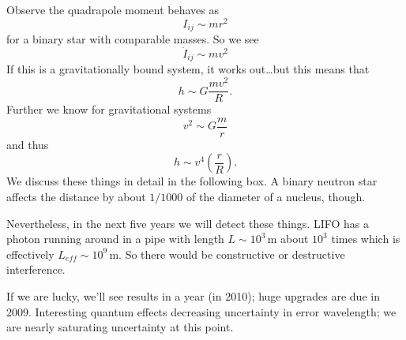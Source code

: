 Observe the quadrapole moment behaves as
\begin{equation}
I_{ij}\sim mr^{2}
\end{equation}
for a binary star with comparable masses. So we see
\begin{equation}
\ddot{I}_{ij}\sim mv^{2}
\end{equation}
If this is a gravitationally bound system, it works out\dots but
this means that
\begin{equation}
h\sim G\frac{mv^{2}}{R}.
\end{equation}
Further we know for gravitational systems
\begin{equation}
v^{2}\sim G\frac{m}{r}
\end{equation}
and thus
\begin{equation}
h\sim v^{4}\left(\frac{r}{R}\right).
\end{equation}
We discuss these things in detail in the following box. A binary
neutron star affects the distance by about $1/1000$ of the
diameter of a nucleus, though.


Nevertheless, in the next five years we will detect these
things. LIFO has a photon running around in a pipe with length
$L\sim 10^{3}\,\mathrm{m}$ about $10^{3}$ times which is
effectively $L_{eff}\sim 10^{9}\,\mathrm{m}$. So there would be
constructive or destructive interference.

If we are lucky, we'll see results in a year (in 2010); huge
upgrades are due in 2009. Interesting quantum effects decreasing
uncertainty in error wavelength; we are nearly saturating
uncertainty at this point.

